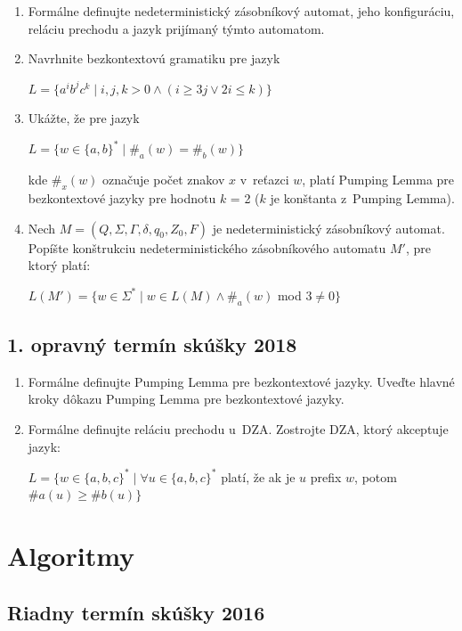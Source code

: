 \documentclass[11pt,a4paper]{article}
\begin{document}
		\begin{enumerate}
			\item Formálne definujte nedeterministický zásobníkový automat, jeho konfiguráciu, reláciu prechodu a jazyk prijímaný týmto automatom.

			\item Navrhnite bezkontextovú gramatiku pre jazyk
	
			$L = \{a^ib^jc^k \mid i,j,k > 0 \land (i \geq 3j \lor 2i \leq k)\}$
	
			\item Ukážte, že pre jazyk
	
			$L = \{w \in \{a,b\}^* \mid \#_a(w) = \#_b(w)\}$
	
			kde $\#_x(w)$ označuje počet znakov $x$ v~reťazci $w$, platí Pumping Lemma pre bezkontextové jazyky pre hodnotu $k$ = 2 ($k$ je konštanta z~Pumping Lemma).
	
			\item Nech $M = (Q, \Sigma, \Gamma, \delta, q_0, Z_0, F)$ je nedeterministický zásobníkový automat. Popíšte konštrukciu nedeterministického zásobníkového automatu $M'$, pre ktorý platí:
	
			$L(M') = \{w \in \Sigma^* \mid w \in L(M) \land \#_a(w)$ mod $3 \neq 0\}$
		
		\end{enumerate}

		\subsection{1. opravný termín skúšky 2018}

		\begin{enumerate}
			\item Formálne definujte Pumping Lemma pre bezkontextové jazyky. Uveďte hlavné kroky dôkazu Pumping Lemma pre bezkontextové jazyky.

			\item Formálne definujte reláciu prechodu u~DZA. Zostrojte DZA, ktorý akceptuje jazyk:
	
			$L = \{w \in \{a,b,c\}^* \mid \forall u \in \{a,b,c\}^*$ platí, že ak je $u$ prefix $w$, potom $\#a(u) \geq \#b(u)\}$
		\end{enumerate}

	\section{Algoritmy}

		\subsection{Riadny termín skúšky 2016}
\end{document}
